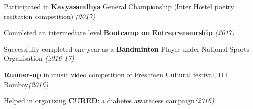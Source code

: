 \begin{cventries}
  \cventry
    {}
    {}
    {}
    {}
    {
    \vspace*{-0.55cm}
      \begin{cvitems}
        \item {Participated in \textbf{Kavyasandhya} General Championship (Inter Hostel poetry recitation competition)\hfill \fontsize{9pt}{1em} \slshape\color{darkgray}(2017)}\vspace{-0.2mm}
        \item{Completed an intermediate level \textbf{Bootcamp on Entrepreneurship }\hfill \fontsize{9pt}{1em} \slshape\color{darkgray}(2017)}\vspace{-0.2mm}
        \item {Successfully completed one year as a \textbf{Bandminton} Player under National Sports Organisation \hfill \fontsize{9pt}{1em} \slshape\color{darkgray}(2016-17)}\vspace{-0.2mm}
        \item{\textbf{Runner-up} in music video competition of Freshmen Cultural festival, IIT Bombay\hfill \fontsize{9pt}{1em}\slshape\color{darkgray}(2016)}\vspace{-0.2  mm}
        \item {Helped in organizing \textbf{CURED}: a diabetes awareness campaign\hfill \fontsize{9pt}{1em}\slshape\color{darkgray}(2016)}
      \end{cvitems}
    }
\end{cventries}
